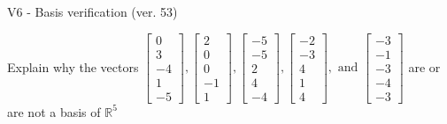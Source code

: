 \begin{exercise}
  \begin{exerciseTitle}V6 - Basis verification (ver. 53)\end{exerciseTitle}
  \begin{exerciseStatement}
    Explain why the vectors \(\left[\begin{array}{r}
0 \\
3 \\
-4 \\
1 \\
-5
\end{array}\right] , \left[\begin{array}{r}
2 \\
0 \\
0 \\
-1 \\
1
\end{array}\right] , \left[\begin{array}{r}
-5 \\
-5 \\
2 \\
4 \\
-4
\end{array}\right] , \left[\begin{array}{r}
-2 \\
-3 \\
4 \\
1 \\
4
\end{array}\right] , \text{ and } \left[\begin{array}{r}
-3 \\
-1 \\
-3 \\
-4 \\
-3
\end{array}\right]\) are or are not a basis of \(\mathbb{R}^5\)	



\end{exerciseStatement}
\end{exercise}
